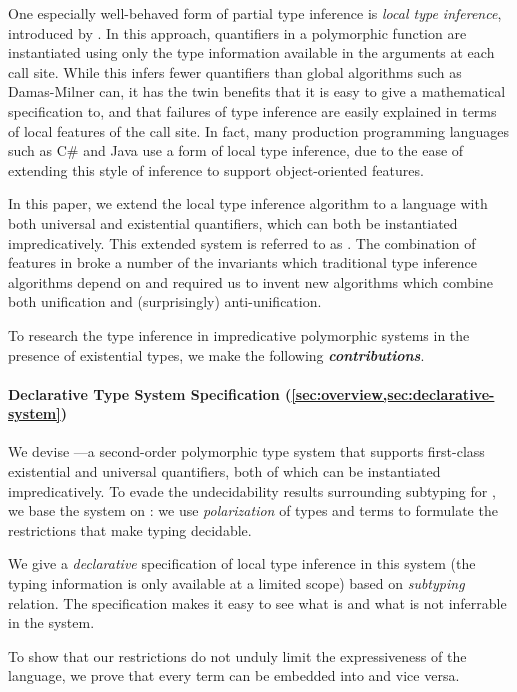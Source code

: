 One especially well-behaved form of partial type inference is 
\emph{local type inference}, introduced by \citet{pierce2000:local}. In this approach,
quantifiers in a polymorphic function are instantiated using only the type
information available in the arguments at each call site. While this infers
fewer quantifiers than global algorithms such as Damas-Milner can, it has the
twin benefits that it is easy to give a mathematical specification to, and that
failures of type inference are easily explained in terms of local features of
the call site. In fact, many production programming languages such as C\# and
Java use a form of local type inference, due to the ease of extending this style
of inference to support object-oriented features. 

In this paper, we extend the local type inference algorithm to a language with
both universal and existential quantifiers, which can both be instantiated
impredicatively. This extended system is referred to as \fexists. The
combination of features in \fexists  broke a number of the invariants which
traditional type inference algorithms depend on and required us to invent
new algorithms which combine both unification and (surprisingly)
anti-unification.

To research the type inference in impredicative polymorphic systems in the
presence of existential types, we make the following
\emph{\textbf{contributions}}.

\paragraph{Declarative Type System Specification (\cref{sec:overview,sec:declarative-system})} 
    We devise \fexists---a second-order polymorphic type system that supports first-class
    existential and universal quantifiers, both of which can be instantiated
    impredicatively. To evade the undecidability results surrounding subtyping
    for \systemf, we base the system on \CBPV \cite{levy2006:cbpv}: we
    use \emph{polarization} of types and terms to formulate the restrictions
    that make typing decidable. 

    We give a \emph{declarative} specification of local type inference in this
    system (\ie the typing information is only available at a limited scope)
    based on \emph{subtyping} relation. The specification makes it easy to see
    what is and what is not inferrable in the system. 

    To show that our restrictions do not unduly limit the expressiveness of the
    language, we prove that every \fexists term can be embedded into \systemf
    and vice versa.

